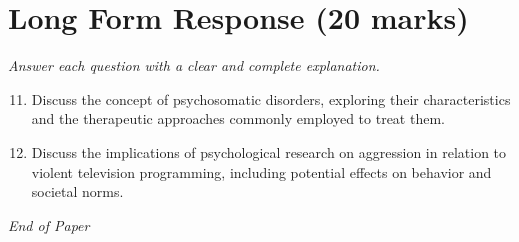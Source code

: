 \documentclass[12pt]{article}
\begin{document}
\section*{Long Form Response (20 marks)}
\textit{Answer each question with a clear and complete explanation.}
\begin{enumerate}[label=\arabic*.]
\setcounter{enumi}{10}
\item Discuss the concept of psychosomatic disorders, exploring their characteristics and the therapeutic approaches commonly employed to treat them.
\item Discuss the implications of psychological research on aggression in relation to violent television programming, including potential effects on behavior and societal norms.
\end{enumerate}

\vfill
\noindent\textit{End of Paper}
\end{document}
